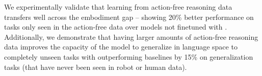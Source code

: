 We experimentally validate that learning from action-free reasoning data transfers well across the embodiment gap -- showing 20\% better performance on tasks only seen in the action-free data over models not finetuned with \ACRO. Additionally, we demonstrate that having larger amounts of action-free reasoning data improves the capacity of the model to generalize in language space to completely unseen tasks with \ACRO outperforming baselines by 15\% on generalization tasks (that have never been seen in robot or human data).


